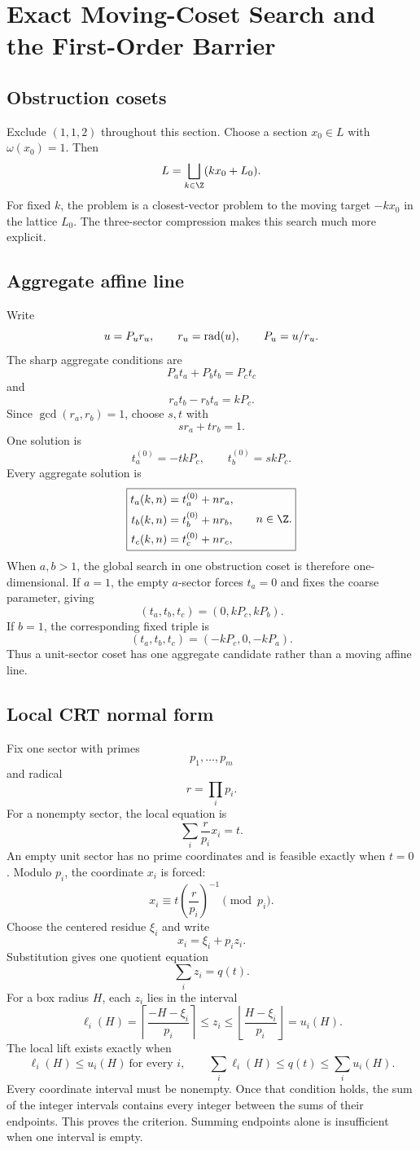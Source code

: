\clearpage
\section{Exact Moving-Coset Search and the First-Order Barrier}

\subsection{Obstruction cosets}
Exclude $(1,1,2)$ throughout this section. Choose a section $x_0\in L$ with $\omega(x_0)=1$. Then
\[
 L
 =
 \bigsqcup_{k\in\Z}
 (kx_0+L_0).
\]
For fixed $k$, the problem is a closest-vector problem to the moving target $-kx_0$ in the lattice $L_0$. The three-sector compression makes this search much more explicit.

\subsection{Aggregate affine line}
Write
\[
 u=P_ur_u,
 \qquad
 r_u=\operatorname{rad}(u),
 \qquad
 P_u=u/r_u.
\]
The sharp aggregate conditions are
\[
 P_at_a+P_bt_b=P_ct_c
\]
and
\[
 r_at_b-r_bt_a=kP_c.
\]
Since $\gcd(r_a,r_b)=1$, choose $s,t$ with
\[
 sr_a+tr_b=1.
\]
One solution is
\[
 t_a^{(0)}=-tkP_c,
 \qquad
 t_b^{(0)}=skP_c.
\]
Every aggregate solution is
\[
 \boxed{
 \begin{aligned}
 t_a(k,n)&=t_a^{(0)}+nr_a,\\
 t_b(k,n)&=t_b^{(0)}+nr_b,\\
 t_c(k,n)&=t_c^{(0)}+nr_c,
 \end{aligned}
 \qquad n\in\Z.
 }
\]
When $a,b>1$, the global search in one obstruction coset is therefore one-dimensional. If $a=1$, the empty $a$-sector forces $t_a=0$ and fixes the coarse parameter, giving
\[
 (t_a,t_b,t_c)=(0,kP_c,kP_b).
\]
If $b=1$, the corresponding fixed triple is
\[
 (t_a,t_b,t_c)=(-kP_c,0,-kP_a).
\]
Thus a unit-sector coset has one aggregate candidate rather than a moving affine line.

\subsection{Local CRT normal form}
Fix one sector with primes
\[
 p_1,\ldots,p_m
\]
and radical
\[
 r=\prod_i p_i.
\]
For a nonempty sector, the local equation is
\[
 \sum_i\frac r{p_i}x_i=t.
\]
An empty unit sector has no prime coordinates and is feasible exactly when $t=0$.
Modulo $p_i$, the coordinate $x_i$ is forced:
\[
 x_i
 \equiv
 t\left(\frac r{p_i}\right)^{-1}
 \pmod{p_i}.
\]
Choose the centered residue $\xi_i$ and write
\[
 x_i=\xi_i+p_i z_i.
\]
Substitution gives one quotient equation
\[
 \sum_i z_i=q(t).
\]
For a box radius $H$, each $z_i$ lies in the interval
\[
 \ell_i(H)
 =
 \left\lceil\frac{-H-\xi_i}{p_i}\right\rceil
 \le z_i\le
 \left\lfloor\frac{H-\xi_i}{p_i}\right\rfloor
 =u_i(H).
\]
The local lift exists exactly when
\[
 \boxed{
 \ell_i(H)\le u_i(H)\ \text{for every }i,\qquad
 \sum_i\ell_i(H)\le q(t)\le\sum_i u_i(H).
 }
\]
Every coordinate interval must be nonempty. Once that condition holds, the sum of the integer intervals contains every integer between the sums of their endpoints. This proves the criterion. Summing endpoints alone is insufficient when one interval is empty.

